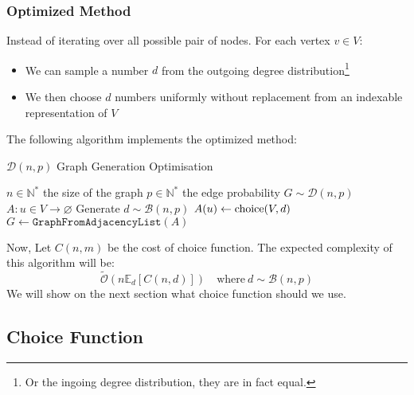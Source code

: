 \subsubsection{Optimized Method}
Instead of iterating over all possible pair of nodes. For each vertex $v\in V$:
\begin{itemize}
	\item We can sample a number $d$ from the outgoing degree distribution\footnote{Or the ingoing degree distribution, they are in fact equal.}
	\item We then choose $d$ numbers uniformly without replacement from an indexable representation of $V$
\end{itemize}
The following algorithm implements the optimized method:
\begin{algorithm}
	\caption{$\mathcal{D}(n,p)$ Graph Generation Optimisation}\label{alg:Dnp_Fast}
	\begin{algorithmic}
		\Require $n\in\mathbb{N}^*$ the size of the graph
		\Require $p\in\mathbb{N}^*$ the edge probability 
		\Ensure $G\sim \mathcal{D}(n,p)$  
		\State $A:u\in V\rightarrow \varnothing$
		\State Generate $d\sim \mathcal{B}(n,p)$
		\State $A(u)\leftarrow \operatorname{choice}(V,d)$
		\EndFor
		\State \Return $G\leftarrow \texttt{GraphFromAdjacencyList}(A)$
	\end{algorithmic}
\end{algorithm}
\FloatBarrier
Now, Let $C(n,m)$ be the cost of choice function. The expected complexity of this algorithm will be:
$$
\tilde{\mathcal{O}}\left(n\mathbb{E}_d[C(n,d)]\right) \quad \text{where}\ d\sim \mathcal{B}(n,p)
$$
We will show on the next section what choice function should we use.
\subsection{Choice Function}
